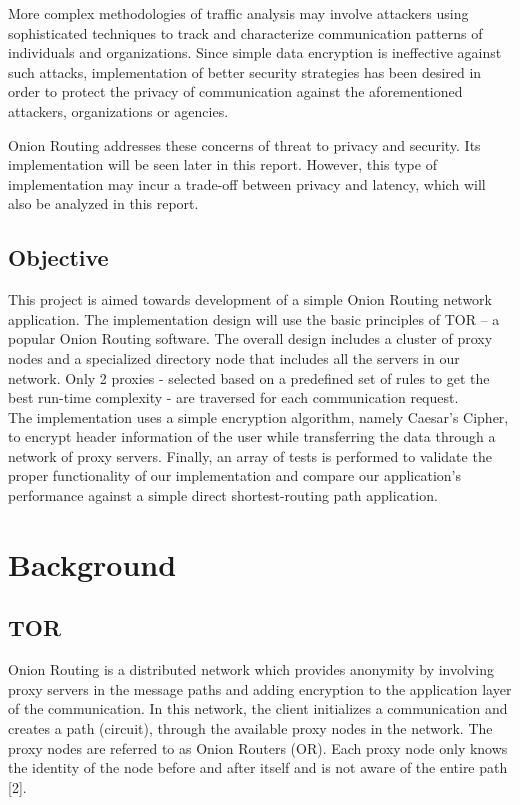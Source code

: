 \documentclass{article}
\begin{document}
\vspace{0.3 cm}

\noindent More complex methodologies of traffic analysis may involve attackers using sophisticated  techniques to track and characterize communication patterns of individuals and organizations. Since simple data encryption is ineffective against such attacks, implementation of better security strategies has been desired in order to protect the privacy of communication against the aforementioned attackers, organizations or agencies. \\

\vspace{0.3 cm}

\noindent Onion Routing addresses these concerns of threat to privacy and security. Its implementation  will be seen later in this report. However, this type of implementation may incur a trade-off between privacy and latency, which will also be analyzed in this report.  

\vspace{0.3 cm}

\subsection{Objective}
This project is aimed towards development of a simple Onion Routing network application. The implementation design will use the basic principles of TOR -- a popular Onion Routing software. The overall design includes a cluster of proxy nodes and a specialized directory node that includes all the servers in our network. Only 2 proxies - selected based on a predefined set of rules to get the best run-time complexity - are traversed for each communication request. \\

\noindent The implementation uses a simple encryption algorithm, namely Caesar's Cipher, to encrypt header information of the user while transferring the data through a network of proxy servers. Finally, an array of tests is performed to validate the proper functionality of our implementation and compare our application's performance against a simple direct shortest-routing path application. \\

\newpage
\section{Background}
\subsection{TOR}
Onion Routing is a distributed network which provides anonymity by involving proxy servers in the message paths and adding encryption to the application layer of the communication. In this network, the client initializes a communication and creates a path (circuit), through the available proxy nodes in the network. The proxy nodes are referred to as Onion Routers (OR). Each proxy node only knows the identity of the node before and after itself and is not aware of the entire path [2]. \\
\end{document}
